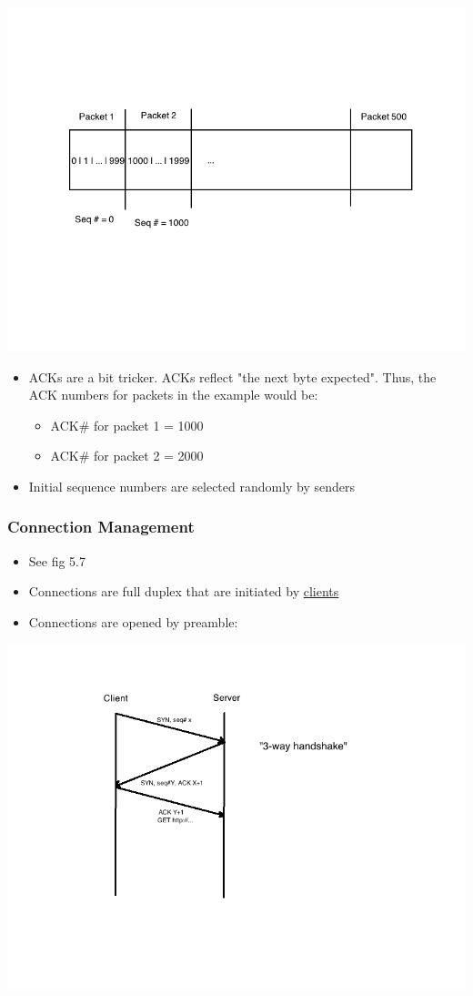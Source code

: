 \documentclass[11pt]{article}
\begin{document}
\includegraphics[width=.9\linewidth]{diagrams/TCPex.png}

\begin{itemize}
\item ACKs are a bit tricker. ACKs reflect "the next byte expected". Thus,
the ACK numbers for packets in the example would be:
\begin{itemize}
\item ACK\# for packet 1 = 1000
\item ACK\# for packet 2 = 2000
\end{itemize}
\item Initial sequence numbers are selected randomly by senders
\end{itemize}

\subsubsection{Connection Management}
\label{sec:orgheadline132}
\begin{itemize}
\item See fig 5.7
\item Connections are full duplex that are initiated by \uline{clients}
\item Connections are opened by preamble:
\end{itemize}

\includegraphics[width=.9\linewidth]{diagrams/connectionmanagement.png}
\end{document}
